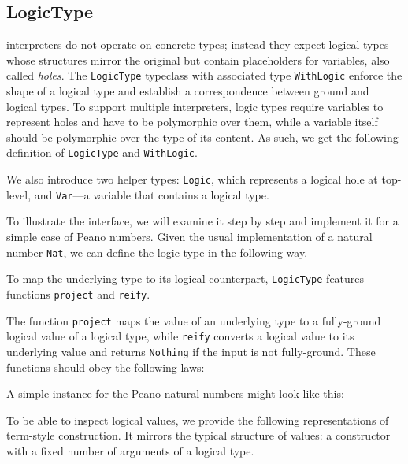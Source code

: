 \subsection{LogicType}
\label{tagless:logic}

\mk interpreters do not operate on concrete \haskell types; instead they expect logical types whose structures mirror the original but contain placeholders for variables, also called \emph{holes}.
The \lstinline{LogicType} typeclass with associated type \lstinline{WithLogic} enforce the shape of a logical type and establish a correspondence between ground and logical types. 
To support multiple interpreters, logic types require variables to represent holes and have to be polymorphic over them, while a variable itself should be polymorphic over the type of its content.
As such, we get the following definition of \lstinline{LogicType} and \lstinline{WithLogic}. 

We also introduce two helper types: \lstinline{Logic}, which represents a logical hole at top-level, and \lstinline{Var}---a variable that contains a logical type.


To illustrate the interface, we will examine it step by step and implement it for a simple case of Peano numbers.
Given the usual implementation of a natural number \lstinline{Nat}, we can define the logic type in the following way. 

To map the underlying type to its logical counterpart, \lstinline{LogicType} features functions \lstinline{project} and \lstinline{reify}.


The function \lstinline{project} maps the value of an underlying type to a fully-ground logical value of a logical type, while \lstinline{reify} converts a logical value to its underlying value and returns \lstinline{Nothing} if the input is not fully-ground.
These functions should obey the following laws:


A simple instance for the Peano natural numbers might look like this:

To be able to inspect logical values, we provide the following representations of term-style construction. 
It mirrors the typical structure of \mk values: a constructor with a fixed number of arguments of a logical type. 

